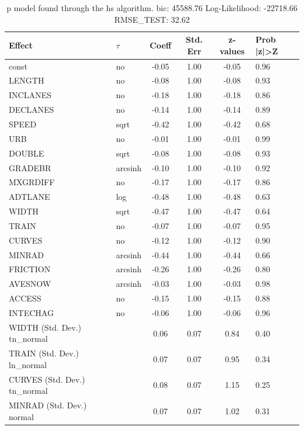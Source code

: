 \begin{table}
	\caption{p model found through the hs algorithm. bic: 45588.76 Log-Likelihood: -22718.66 RMSE_TEST: 32.62}
	\begin{center}
		\begin{tabular}{|l|l|c|c|c|l|}
			\hline
			Effect & $\tau$ & Coeff & Std. Err & z-values & Prob |z|>Z \\
			\hline
			const & no & -0.05 & 1.00 & -0.05 & 0.96 \\
			\hline
			LENGTH & no & -0.08 & 1.00 & -0.08 & 0.93 \\
			\hline
			INCLANES & no & -0.18 & 1.00 & -0.18 & 0.86 \\
			\hline
			DECLANES & no & -0.14 & 1.00 & -0.14 & 0.89 \\
			\hline
			SPEED & sqrt & -0.42 & 1.00 & -0.42 & 0.68 \\
			\hline
			URB & no & -0.01 & 1.00 & -0.01 & 0.99 \\
			\hline
			DOUBLE & sqrt & -0.08 & 1.00 & -0.08 & 0.93 \\
			\hline
			GRADEBR & arcsinh & -0.10 & 1.00 & -0.10 & 0.92 \\
			\hline
			MXGRDIFF & no & -0.17 & 1.00 & -0.17 & 0.86 \\
			\hline
			ADTLANE & log & -0.48 & 1.00 & -0.48 & 0.63 \\
			\hline
			WIDTH & sqrt & -0.47 & 1.00 & -0.47 & 0.64 \\
			\hline
			TRAIN & no & -0.07 & 1.00 & -0.07 & 0.95 \\
			\hline
			CURVES & no & -0.12 & 1.00 & -0.12 & 0.90 \\
			\hline
			MINRAD & arcsinh & -0.44 & 1.00 & -0.44 & 0.66 \\
			\hline
			FRICTION & arcsinh & -0.26 & 1.00 & -0.26 & 0.80 \\
			\hline
			AVESNOW & arcsinh & -0.03 & 1.00 & -0.03 & 0.98 \\
			\hline
			ACCESS & no & -0.15 & 1.00 & -0.15 & 0.88 \\
			\hline
			INTECHAG & no & -0.06 & 1.00 & -0.06 & 0.96 \\
			\hline
			WIDTH (Std. Dev.) tn_normal &  & 0.06 & 0.07 & 0.84 & 0.40 \\
			\hline
			TRAIN (Std. Dev.) ln_normal &  & 0.07 & 0.07 & 0.95 & 0.34 \\
			\hline
			CURVES (Std. Dev.) tn_normal &  & 0.08 & 0.07 & 1.15 & 0.25 \\
			\hline
			MINRAD (Std. Dev.) normal &  & 0.07 & 0.07 & 1.02 & 0.31 \\

\end{tabular}
\end{center}
\end{table}
